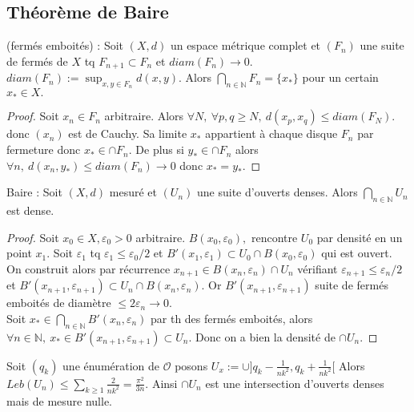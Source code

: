 \subsection{Théorème de Baire}
\begin{lemme}
    (fermés emboités) : Soit $(X,d)$ un espace métrique complet et $(F_n)$ une suite de fermés de $X$ tq $F_{n+1}\subset F_n$ et $diam(F_n)\to 0.$ $diam(F_n):=\sup_{x,y\in F_n}d(x,y)$. Alors $\bigcap\limits_{n\in \mathbb{N} } F_n=\{x_*\} $ pour un certain $x_*\in X.$
\end{lemme}
\begin{proof}
    Soit $x_{n}\in F_n$ arbitraire. Alors $\forall N,\ \forall p,q\ge N,\ d(x_p,x_q)\le diam(F_N).  $ donc $(x_{n})$ est de Cauchy. Sa limite $x_*$ appartient à chaque disque $F_n$ par fermeture donc $x_*\in \cap F_n.$ De plus si $y_*\in \cap F_n$ alors $\forall n,\ d(x_{n},y_*)\le diam(F_n)\to 0 $ donc $x_*=y_*$.
\end{proof}
\begin{theoreme}
    Baire : Soit $(X,d)$ mesuré et $(U_n)$ une suite d'ouverts denses. Alors $\bigcap\limits_{n\in \mathbb{N} } U_n$ est dense.
\end{theoreme}
\begin{proof}
    Soit $x_0\in X, \varepsilon _0 >0$ arbitraire. $B(x_0,\varepsilon _0),$ rencontre $U_0$ par densité en un point $x_1.$ Soit $\varepsilon _1$ tq $\varepsilon _1\le \varepsilon _0 /2$ et $B'(x_1,\varepsilon _1)\subset U_0\cap B(x_0,\varepsilon _0)$ qui est ouvert.\\
    On construit alors par récurrence $x_{n+1}\in B(x_n,\varepsilon _n)\cap U_n$ vérifiant $\varepsilon _{n+1}\le \varepsilon _n /2$ et $B'(x_{n+1},\varepsilon _{n+1})\subset U_n\cap B(x_{n},\varepsilon _n)$. Or $B'(x_{n+1},\varepsilon _{n+1})$ suite de fermés emboités de diamètre $\le 2\varepsilon _n\to 0$.\\
    Soit $x_*\in \bigcap\limits_{n\in \mathbb{N} } B'(x_n,\varepsilon _n)$ par th des fermés emboités, alors $\forall n\in \mathbb{N} ,\ x_*\in B'(x_{n+1},\varepsilon _{n+1})\subset U_n $. Donc on a bien la densité de $\cap U_n$.
\end{proof}
\begin{ex}
    Soit $(q_k)$ une énumération de $\mathcal{O}$ posons $U_x:=\cup ]q_k-\frac{1}{nk^2},q_k+\frac{1}{nk^2}[$ Alors $Leb(U_n)\le \sum\limits_{k\ge 1}^{} \frac{2}{nk^2}=\frac{\pi^2}{3n}$. Ainsi $\cap U_n$ est une intersection d'ouverts denses mais de mesure nulle.
\end{ex}
